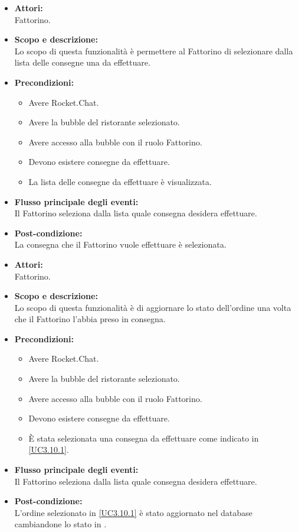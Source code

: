 
\begin{itemize}
	\item \textbf{Attori:}
	\\Fattorino.
	\item \textbf{Scopo e descrizione:} 
	\\Lo scopo di questa funzionalità è permettere al Fattorino di selezionare dalla lista delle consegne una da effettuare.
	\item \textbf{Precondizioni:}
	\begin{itemize}
		\item Avere Rocket.Chat.
		\item Avere la bubble del ristorante selezionato.
		\item Avere accesso alla bubble con il ruolo Fattorino.
		\item Devono esistere consegne da effettuare.
		\item La lista delle consegne da effettuare è visualizzata.
	\end{itemize}
	\item \textbf{Flusso principale degli eventi:}
	\\Il Fattorino seleziona dalla lista quale consegna desidera effettuare.
	\item \textbf{Post-condizione:}
	\\La consegna che il Fattorino vuole effettuare è selezionata.
\end{itemize}


\begin{itemize}
	\item \textbf{Attori:}
	\\Fattorino.
	\item \textbf{Scopo e descrizione:} 
	\\Lo scopo di questa funzionalità è di aggiornare lo stato dell'ordine una volta che il Fattorino l'abbia preso in consegna.
	\item \textbf{Precondizioni:}
	\begin{itemize}
		\item Avere Rocket.Chat.
		\item Avere la bubble del ristorante selezionato.
		\item Avere accesso alla bubble con il ruolo Fattorino.
		\item Devono esistere consegne da effettuare.
		\item È stata selezionata una consegna da effettuare come indicato in \ref{UC3.10.1}.
	\end{itemize}
	\item \textbf{Flusso principale degli eventi:}
	\\Il Fattorino seleziona dalla lista quale consegna desidera effettuare.
	\item \textbf{Post-condizione:}
	\\L'ordine selezionato in \ref{UC3.10.1} è stato aggiornato nel database cambiandone lo stato in .
\end{itemize}

